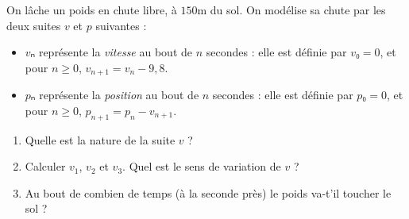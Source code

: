 \documentclass[
	classe=$1^{ere}STI2D$
]{évaluation}
\begin{document}
\begin{exercice}[4]
	On lâche un poids en chute libre, à $150$m du sol. On modélise sa chute par les deux suites $v$ et $p$ suivantes :

	\begin{itemize}
		\item $vₙ$ représente la \textit{vitesse} au bout de $n$ secondes : elle est définie par $v₀ = 0$, et pour $n ≥ 0$, $v_{n+1} = v_n - 9,8$.
		\item $pₙ$ représente la \textit{position} au bout de $n$ secondes : elle est définie par $p₀ = 0$, et pour $n ≥ 0$, $p_{n+1} = p_n - v_{n+1}$.
	\end{itemize}

	\begin{enumerate}
		\item Quelle est la nature de la suite $v$ ?
		\item Calculer $v_1$, $v_2$ et $v_3$. Quel est le sens de variation de $v$ ?
		\item Au bout de combien de temps (à la seconde près) le poids va-t'il toucher le sol ?
	\end{enumerate}
\end{exercice}
\end{document}

